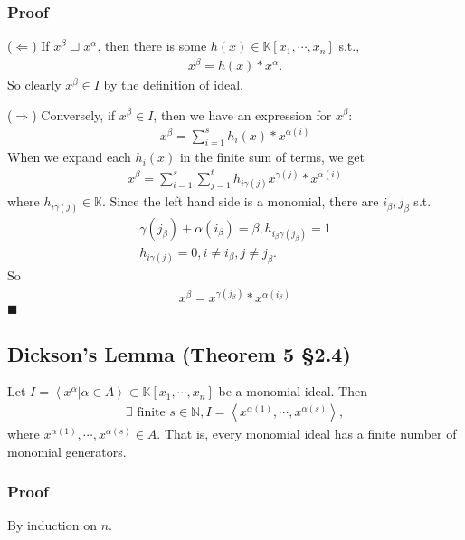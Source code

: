 \documentclass[11pt]{book}
\begin{document}
\subsubsection{Proof}
($\Leftarrow$)
If $x^\beta \sqsupseteq x^\alpha$, then there is some $h(x) \in \mathbb{K}[x_1, \cdots, x_n]$ s.t.,
\begin{eqnarray}
x^\beta = h(x) * x^\alpha.
\end{eqnarray}
So clearly $x^\beta \in I$ by the definition of ideal.

($\Rightarrow$)
Conversely, if $x^\beta \in I$, then we have an expression for $x^\beta$:
\begin{eqnarray}
x^\beta = \sum_{i=1}^s h_i(x) * x^{\alpha(i)}
\end{eqnarray}
When we expand each $h_i(x)$ in the finite sum of terms, we get
\begin{eqnarray}
x^\beta = \sum_{i=1}^s \sum_{j=1}^t h_{i \gamma(j)} x^{\gamma(j)} * x^{\alpha(i)}
\end{eqnarray}
where $h_{i \gamma(j)} \in \mathbb{K}$.
Since the left hand side is a monomial, there are $i_\beta, j_\beta$ s.t.
\begin{eqnarray}
\gamma(j_\beta) + \alpha(i_\beta) = \beta,  h_{i_\beta \gamma(j_\beta)} = 1 \\
h_{i \gamma(j)} = 0, i \neq i_\beta, j \neq j_\beta.
\end{eqnarray}
So
\begin{eqnarray}
x^\beta = x^{\gamma(j_\beta)} * x^{\alpha(i_\beta)}
\end{eqnarray}
$\blacksquare$

\subsection{Dickson's Lemma (Theorem 5 \S2.4)}
\label{Dickson}
Let $I = \left<\left. x^\alpha \right| \alpha \in A\right> \subset \mathbb{K}[x_1, \cdots, x_n]$ be a monomial ideal.
Then
\begin{eqnarray}
\exists \text{ finite } s \in \mathbb{N}, I = \left<x^{\alpha(1)}, \cdots, x^{\alpha(s)} \right>,
\end{eqnarray}
where $x^{\alpha(1)}, \cdots, x^{\alpha(s)} \in A$.
That is, every monomial ideal has a finite number of monomial generators.

\subsubsection{Proof}
By induction on $n$.%
\end{document}
